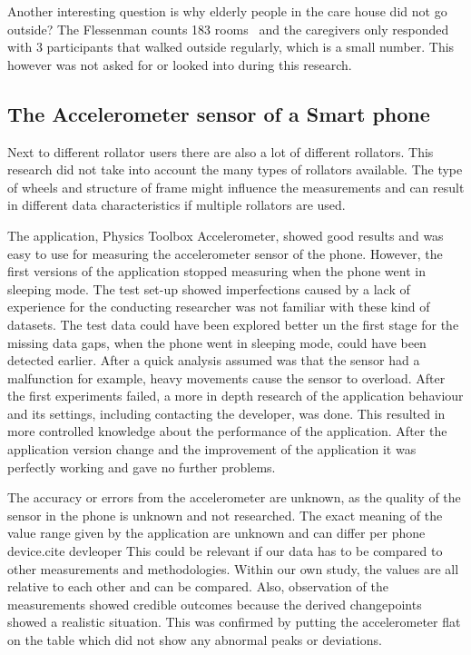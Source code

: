 Another interesting question is why elderly people in the care house did not go outside? The Flessenman counts 183 rooms~\cite{flessenman} and the caregivers only responded with 3 participants that walked outside regularly, which is a small number. This however was not asked for or looked into during this research. 

\subsection{The Accelerometer sensor of a Smart phone}
Next to different rollator users there are also a lot of different rollators. This research did not take into account the many types of rollators available. The type of wheels and structure of frame might influence the measurements and can result in different data characteristics if multiple rollators are used.

The application, Physics Toolbox Accelerometer, showed good results and was easy to use for measuring the accelerometer sensor of the phone. However, the first versions of the application stopped measuring when the phone went in sleeping mode. The test set-up showed imperfections caused by a lack of experience for the conducting researcher was not familiar with these kind of datasets. The test data could have been explored better un the first stage for the missing data gaps, when the phone went in sleeping mode, could have been detected earlier. After a quick analysis assumed was that the sensor had a malfunction for example, heavy movements cause the sensor to overload. After the first experiments failed, a more in depth research of the application behaviour and its settings, including contacting the developer, was done. This resulted in more controlled knowledge about the performance of the application. After the application version change and the improvement of the application it was perfectly working and gave no further problems. 

The accuracy or errors from the accelerometer are unknown, as the quality of the sensor in the phone is unknown and not researched. The exact meaning of the value range given by the application are unknown and can differ per phone device.{cite devleoper} This could be relevant if our data has to be compared to other measurements and methodologies. Within our own study, the values are all relative to each other and can be compared. Also, observation of the measurements showed credible outcomes because the derived changepoints showed a realistic situation. This was confirmed by putting the accelerometer flat on the table which did not show any abnormal peaks or deviations. 

